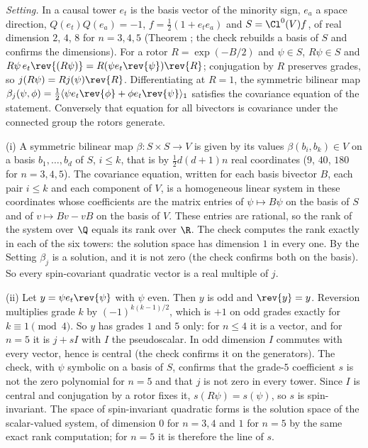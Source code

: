 \emph{Setting.} In a causal tower $e_{t}$ is the basis vector of the minority sign, $e_{a}$ a space direction, $Q(e_{t})Q(e_{a}) = -1$, $f = \tfrac12(1 + e_{t}e_{a})$ and $S = \Cl^{0}(V)f$, of real dimension $2$, $4$, $8$ for $n = 3, 4, 5$ (Theorem ; the check rebuilds a basis of $S$ and confirms the dimensions). For a rotor $R = \exp(-B/2)$ and $\psi \in S$, $R\psi \in S$ and $R\psi\, e_{t}\rev{(R\psi)} = R(\psi e_{t}\rev{\psi})\rev{R}$; conjugation by $R$ preserves grades, so $j(R\psi) = Rj(\psi)\rev{R}$. Differentiating at $R = 1$, the symmetric bilinear map $\beta_{j}(\psi, \phi) = \tfrac12\langle \psi e_{t}\rev{\phi} + \phi e_{t}\rev{\psi}\rangle_{1}$ satisfies the covariance equation of the statement. Conversely that equation for all bivectors is covariance under the connected group the rotors generate.

(i) A symmetric bilinear map $\beta : S \times S \to V$ is given by its values $\beta(b_{i}, b_{k}) \in V$ on a basis $b_{1}, \ldots, b_{d}$ of $S$, $i \le k$, that is by $\tfrac12 d(d+1)n$ real coordinates ($9$, $40$, $180$ for $n = 3, 4, 5$). The covariance equation, written for each basis bivector $B$, each pair $i \le k$ and each component of $V$, is a homogeneous linear system in these coordinates whose coefficients are the matrix entries of $\psi \mapsto B\psi$ on the basis of $S$ and of $v \mapsto Bv - vB$ on the basis of $V$. These entries are rational, so the rank of the system over $\Q$ equals its rank over $\R$. The check computes the rank exactly in each of the six towers: the solution space has dimension $1$ in every one. By the Setting $\beta_{j}$ is a solution, and it is not zero (the check confirms both on the basis). So every spin-covariant quadratic vector is a real multiple of $j$.

(ii) Let $y = \psi e_{t}\rev{\psi}$ with $\psi$ even. Then $y$ is odd and $\rev{y} = y$. Reversion multiplies grade $k$ by $(-1)^{k(k-1)/2}$, which is $+1$ on odd grades exactly for $k \equiv 1 \pmod 4$. So $y$ has grades $1$ and $5$ only: for $n \le 4$ it is a vector, and for $n = 5$ it is $j + sI$ with $I$ the pseudoscalar. In odd dimension $I$ commutes with every vector, hence is central (the check confirms it on the generators). The check, with $\psi$ symbolic on a basis of $S$, confirms that the grade-$5$ coefficient $s$ is not the zero polynomial for $n = 5$ and that $j$ is not zero in every tower. Since $I$ is central and conjugation by a rotor fixes it, $s(R\psi) = s(\psi)$, so $s$ is spin-invariant. The space of spin-invariant quadratic forms is the solution space of the scalar-valued system, of dimension $0$ for $n = 3, 4$ and $1$ for $n = 5$ by the same exact rank computation; for $n = 5$ it is therefore the line of $s$.

